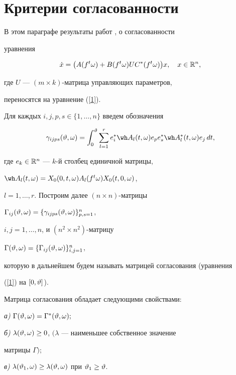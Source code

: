 \section{Критерии согласованности}





В этом параграфе результаты работ \cite{PT94}, \cite{PT97} о согласованности


уравнения


\begin{equation}


\label{4.0}


\Dot x=\big(A(f^t\omega)+B(f^t\omega)UC^*(f^t\omega)\big)x,\quad x\in\R^n,


\end{equation}


где $U$ --- $(m\times k)$-матрица управляющих параметров,


переносятся на уравнение (\ref{1}).


Для каждых $i,j,p,s\in\{1,\dotsc,n\}$ введем обозначения


$$


\gamma_{ijps}(\vt,\omega)=\int_0^{\vt}\sum_{l=1}^re_i^*\wh


A_l(t,\omega)e_p e_s^*\wh A_l^*(t,\omega)e_j\,dt,


$$


где $e_k\in\Bbb R^n$ --- $k$-й столбец единичной матрицы,


$\wh A_l(t,\omega)=X_0(0,t,\omega)A_l(f^t\omega)X_0(t,0,\omega)$,


$l=1,\dotsc,r$. Построим далее $(n\times n)$-матрицы


$\Gamma_{ij}(\vartheta,\omega)=\{\gamma_{ijps}(\vartheta,\omega)\}_{p,s=1}^n$,


$i,j=1,\dotsc,n$, и $(n^2\times n^2)$-матрицу


$\Gamma(\vartheta,\omega)=\{\Gamma_{ij}(\vartheta,\omega)\}_{i,j=1}^n$,


которую в дальнейшем будем называть матрицей согласования (уравнения


(\ref{1}) на $[0,\vartheta]$).





\begin{lem}


\label{l4.1}


Матрица согласования обладает следующими свойствами$:$





{\em а)} $\Gamma(\vartheta,\omega)=\Gamma^*(\vartheta,\omega);$





{\em б)} $\lambda(\vartheta,\omega)\ge 0$, $(\lambda$ --- наименьшее собственное значение


матрицы $\Gamma);$





{\em в)} $\lambda(\vartheta_1,\omega)\ge\lambda(\vartheta,\omega)$ при $\vartheta_1\ge\vartheta$.


\end{lem}





